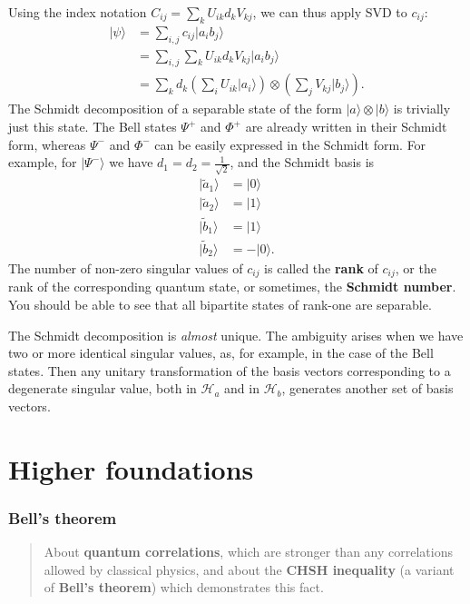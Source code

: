 \documentclass[fleqn,a4paper]{article}
\let\oldsection\section
\renewcommand\section{\clearpage\oldsection}
\let\oldpart\part
\renewcommand\part{\clearpage\oldpart}
\theoremstyle{definition}
\theoremstyle{definition}
\theoremstyle{definition}
\theoremstyle{definition}
\theoremstyle{remark}
\begin{document}
Using the index notation \(C_{ij} = \sum_k U_{ik}d_k V_{kj}\), we can thus apply SVD to \(c_{ij}\):
\[
  \begin{aligned}
    |\psi\rangle
    &= \sum_{i,j} c_{ij}|a_ib_j\rangle
  \\&= \sum_{i,j} \sum_k U_{ik}d_k V_{kj}|a_ib_j\rangle
  \\&= \sum_k d_k \left(\sum_i U_{ik}|a_i\rangle\right)\otimes\left(\sum_j V_{kj}|b_j\rangle\right).
  \end{aligned}
\]
The Schmidt decomposition of a separable state of the form
\(|a\rangle\otimes|b\rangle\) is trivially just this state.
The Bell states \(\Psi^+\) and \(\Phi^+\) are already written in their Schmidt form, whereas \(\Psi^-\) and \(\Phi^-\) can be easily expressed in the Schmidt form.
For example, for \(|\Psi^-\rangle\) we have \(d_1 = d_2 = \frac{1}{\sqrt{2}}\), and the Schmidt basis is
\[
  \begin{aligned}
    |\tilde{a}_1\rangle &= |0\rangle
  \\|\tilde{a}_2\rangle &= |1\rangle
  \\|\tilde{b}_1\rangle &= |1\rangle
  \\|\tilde{b}_2\rangle &= -|0\rangle.
  \end{aligned}
\]
The number of non-zero singular values of \(c_{ij}\) is called the \textbf{rank} of \(c_{ij}\), or the rank of the corresponding quantum state, or sometimes, the \textbf{Schmidt number}.
You should be able to see that all bipartite states of rank-one are separable.

The Schmidt decomposition is \emph{almost} unique.
The ambiguity arises when we have two or more identical singular values, as, for example, in the case of the Bell states.
Then any unitary transformation of the basis vectors corresponding to a degenerate singular value, both in \(\mathcal{H}_a\) and in \(\mathcal{H}_b\), generates another set of basis vectors.

\hypertarget{part-higher-foundations}{%
\part{Higher foundations}\label{part-higher-foundations}}

\hypertarget{bells-theorem}{%
\section{Bell's theorem}\label{bells-theorem}}

\begin{quote}
About \textbf{quantum correlations}, which are stronger than any correlations allowed by classical physics, and about the \textbf{CHSH inequality} (a variant of \textbf{Bell's theorem}) which demonstrates this fact.
\end{quote}
\end{document}
